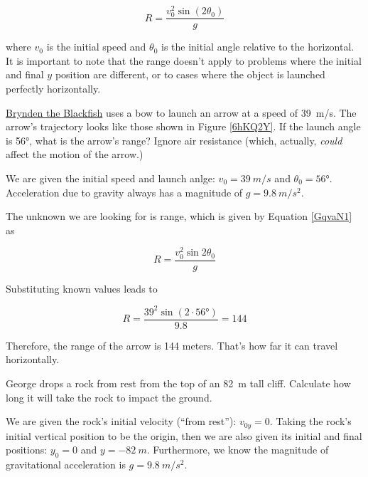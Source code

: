 \documentclass[main.tex]{subfiles}
\begin{document}
\begin{equation} \label{GqvaN1}
    R = \frac{v_0^2 \sin{(2\theta_0)}}{g}
\end{equation}

where $v_0$ is the initial speed and $\theta_0$ is the initial angle relative to the horizontal. It is important to note that the range doesn't apply to problems where the initial and final $y$ position are different, or to cases where the object is launched perfectly horizontally.

\begin{example}
    \href{https://youtu.be/9Ijev8RHF04}{Brynden the Blackfish} uses a bow to launch an arrow at a speed of \SI{39}{m/s}. The arrow's trajectory looks like those shown in Figure \ref{6hKQ2Y}. If the launch angle is \ang{56}, what is the arrow's range? Ignore air resistance (which, actually, \textit{could} affect the motion of the arrow.) 
\end{example}

\Solution We are given the initial speed and launch anlge: $v_0 = \SI{39}{m/s}$ and $\theta_0 = \ang{56}$. Acceleration due to gravity always has a magnitude of $g = \SI{9.8}{m/s^2}$. 

\vspace{1em}

The unknown we are looking for is range, which is given by Equation \eqref{GqvaN1} as

\begin{equation*}
    R = \frac{v_0^2 \sin{2\theta_0}}{g}
\end{equation*}

Substituting known values leads to

\begin{equation*}
    R = \frac{39^2 \sin{(2 \cdot \ang{56})}}{9.8} = 144
\end{equation*}

Therefore, the range of the arrow is 144 meters. That's how far it can travel horizontally.

\endsolution

\begin{example} \label{9XXF9X}
    George drops a rock from rest from the top of an \SI{82}{m} tall cliff. Calculate how long it will take the rock to impact the ground. 
\end{example}

\Solution We are given the rock's initial velocity (``from rest''): $v_{0y} = 0$. Taking the rock's initial vertical position to be the origin, then we are also given its initial and final positions: $y_0 = 0$ and $y = \SI{-82}{m}$. Furthermore, we know the magnitude of gravitational acceleration is $g = \SI{9.8}{m/s^2}$. 
\end{document}
